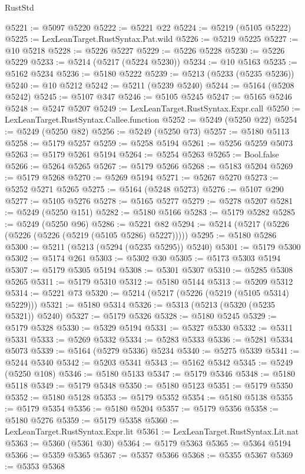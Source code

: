 \begin{lexlean}{RustStd}
\begin{coremodule}
@5221 := @5097 @5220
@5222 := @5221 @22
@5224 := @5219 (@5105 @5222)
@5225 := LexLeanTarget.RustSyntax.Pat.wild
@5226 := @5219 @5225
@5227 := @10 @5218
@5228 := @5226 @5227
@5229 := @5226 @5228
@5230 := @5226 @5229
@5233 := @5214 (@5217 (@5224 @5230))
@5234 := @10 @5163
@5235 := @5162 @5234
@5236 := @5180 @5222
@5239 := @5213 (@5233 (@5235 @5236))
@5240 := @10 @5212
@5242 := @5211 (@5239 @5240)
@5244 := @5164 (@5208 @5242)
@5245 := @5107 @347
@5246 := @5105 @5245
@5247 := @5165 @5246
@5248 := @5247 @5207
@5249 := LexLeanTarget.RustSyntax.Expr.call
@5250 := LexLeanTarget.RustSyntax.Callee.function
@5252 := @5249 (@5250 @22)
@5254 := @5249 (@5250 @82)
@5256 := @5249 (@5250 @73)
@5257 := @5180 @5113
@5258 := @5179 @5257
@5259 := @5258 @5194
@5261 := @5256 @5259 @5073
@5263 := @5179 @5261 @5194
@5264 := @5254 @5263
@5265 := Bool.false
@5266 := @5264 @5265
@5267 := @5179 @5266
@5268 := @5183 @5204
@5269 := @5179 @5268
@5270 := @5269 @5194
@5271 := @5267 @5270
@5273 := @5252 @5271 @5265
@5275 := @5164 (@5248 @5273)
@5276 := @5107 @290
@5277 := @5105 @5276
@5278 := @5165 @5277
@5279 := @5278 @5207
@5281 := @5249 (@5250 @151)
@5282 := @5180 @5166
@5283 := @5179 @5282
@5285 := @5249 (@5250 @96)
@5286 := @5221 @82
@5294 := @5214 (@5217 (@5226 (@5226 (@5226 (@5219 (@5105 @5286) @5227)))))
@5295 := @5180 @5286
@5300 := @5211 (@5213 (@5294 (@5235 @5295)) @5240)
@5301 := @5179 @5300
@5302 := @5174 @261
@5303 := @5302 @30
@5305 := @5173 @5303 @5194
@5307 := @5179 @5305 @5194
@5308 := @5301 @5307
@5310 := @5285 @5308 @5265
@5311 := @5179 @5310
@5312 := @5180 @5144
@5313 := @5209 @5312
@5314 := @5221 @73
@5320 := @5214 (@5217 (@5226 (@5219 (@5105 @5314) @5229)))
@5321 := @5180 @5314
@5326 := @5313 (@5213 (@5320 (@5235 @5321)) @5240)
@5327 := @5179 @5326
@5328 := @5180 @5245
@5329 := @5179 @5328
@5330 := @5329 @5194
@5331 := @5327 @5330
@5332 := @5311 @5331
@5333 := @5269 @5332
@5334 := @5283 @5333
@5336 := @5281 @5334 @5073
@5339 := @5164 (@5279 @5336) @5234
@5340 := @5275 @5339
@5341 := @5244 @5340
@5342 := @5203 @5341
@5343 := @5162 @5342
@5345 := @5249 (@5250 @108)
@5346 := @5180 @5133
@5347 := @5179 @5346
@5348 := @5180 @5118
@5349 := @5179 @5348
@5350 := @5180 @5123
@5351 := @5179 @5350
@5352 := @5180 @5128
@5353 := @5179 @5352
@5354 := @5180 @5138
@5355 := @5179 @5354
@5356 := @5180 @5204
@5357 := @5179 @5356
@5358 := @5180 @5276
@5359 := @5179 @5358
@5360 := LexLeanTarget.RustSyntax.Expr.lit
@5361 := LexLeanTarget.RustSyntax.Lit.nat
@5363 := @5360 (@5361 @30)
@5364 := @5179 @5363
@5365 := @5364 @5194
@5366 := @5359 @5365
@5367 := @5357 @5366
@5368 := @5355 @5367
@5369 := @5353 @5368

\end{coremodule}
\end{lexlean}
